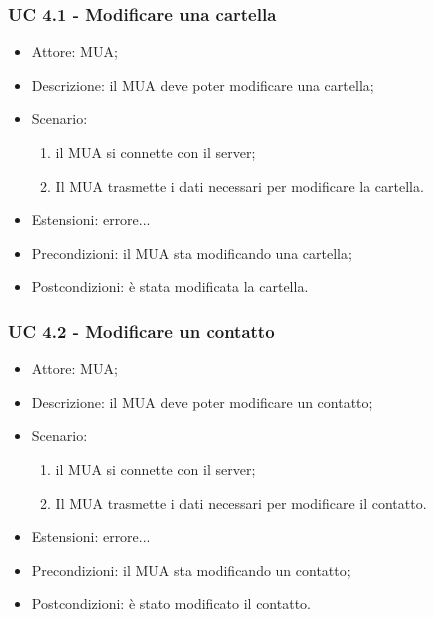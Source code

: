     \subsubsection{UC 4.1 - Modificare una cartella} \label{sec: UC 4.1}
    \begin{itemize}
        \item Attore: MUA;
        \item Descrizione: il MUA deve poter modificare una cartella;
        \item Scenario:
        \begin{enumerate}
        \item il MUA si connette con il server;
        \item Il MUA trasmette i dati necessari per modificare la cartella.
        \end{enumerate}
        \item Estensioni: errore...
        \item Precondizioni: il MUA sta modificando una cartella;
        \item Postcondizioni: è stata modificata la cartella.
    \end{itemize}

    \subsubsection{UC 4.2 - Modificare un contatto} \label{sec: UC 4.2}
    \begin{itemize}
        \item Attore: MUA;
        \item Descrizione: il MUA deve poter modificare un contatto;
        \item Scenario:
        \begin{enumerate}
        \item il MUA si connette con il server;
        \item Il MUA trasmette i dati necessari per modificare il contatto.
        \end{enumerate}
        \item Estensioni: errore...
        \item Precondizioni: il MUA sta modificando un contatto;
        \item Postcondizioni: è stato modificato il contatto.
    \end{itemize}

